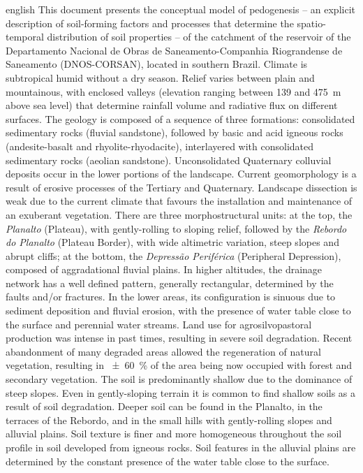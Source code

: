 \begin{chapterabstract}{english}{\enkeys}
This document presents the conceptual model of pedogenesis -- an explicit description of soil-forming factors 
and processes that determine the spatio-temporal distribution of soil properties  -- of the catchment of the 
reservoir of the Departamento Nacional de Obras de Saneamento-Companhia Riograndense de Saneamento 
(DNOS-CORSAN), located in southern Brazil. Climate is subtropical humid without a dry season. Relief varies 
between plain and mountainous, with enclosed valleys (elevation ranging between \num{139} and \SI{475}{\m} 
above sea level) that determine rainfall volume and radiative flux on different surfaces. The geology is 
composed of a sequence of three formations: consolidated sedimentary rocks (fluvial sandstone), followed by 
basic and acid igneous rocks (andesite-basalt and rhyolite-rhyodacite), interlayered with consolidated 
sedimentary rocks (aeolian sandstone). Unconsolidated Quaternary colluvial deposits occur in the lower 
portions of the landscape. Current geomorphology is a result of erosive processes of the Tertiary and 
Quaternary. Landscape dissection is weak due to the current climate that favours the installation and 
maintenance of an exuberant vegetation. There are three morphostructural units: at the top, the 
\textit{Planalto} (Plateau), with gently-rolling to sloping relief, followed by the \textit{Rebordo do 
Planalto} (Plateau Border), with wide altimetric variation, steep slopes and abrupt cliffs; at the bottom, 
the \textit{Depressão Periférica} (Peripheral Depression), composed of aggradational fluvial plains. In 
higher altitudes, the drainage network has a well defined pattern, generally rectangular, determined by the 
faults and/or fractures. In the lower areas, its configuration is sinuous due to sediment deposition and 
fluvial erosion, with the presence of water table close to the surface and perennial water streams. Land use 
for agrosilvopastoral production was intense in past times, resulting in severe soil degradation. Recent 
abandonment of many degraded areas allowed the regeneration of natural vegetation, resulting in 
\SI{\pm60}{\percent} of the area being now occupied with forest and secondary vegetation. The soil is 
predominantly shallow due to the dominance of steep slopes. Even in gently-sloping terrain it is common to 
find shallow soils as a result of soil degradation. Deeper soil can be found in the Planalto, in the terraces 
of the Rebordo, and in the small hills with gently-rolling slopes and alluvial plains. Soil texture is finer 
and more homogeneous throughout the soil profile in soil developed from igneous rocks. Soil features in the 
alluvial plains are determined by the constant presence of the water table close to the surface.
\end{chapterabstract}

